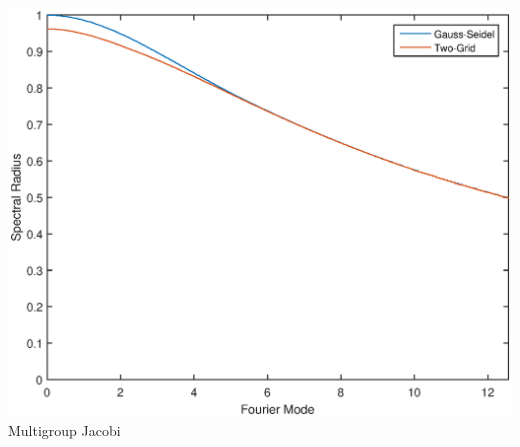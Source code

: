 \documentclass[compress,10pt]{beamer}
\begin{document}
\begin{frame}[t]
{\vspace{1cm}
\begin{columns}
\centering
\includegraphics[width=1.00\textwidth]{images/FA_graphite_MJA.eps}\\
Multigroup Jacobi
\end{columns}
}
\end{frame}
\end{document}

